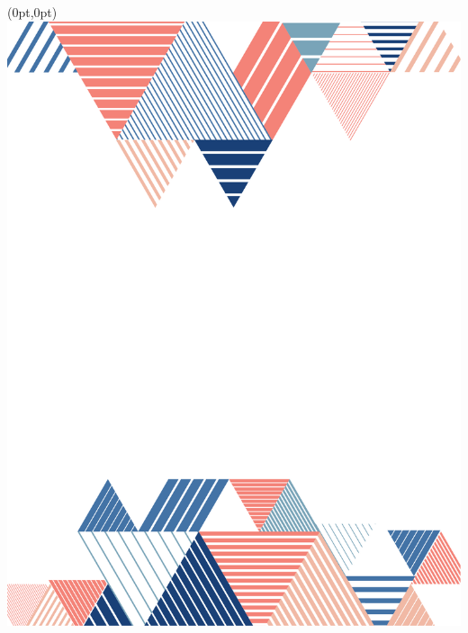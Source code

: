 




\begingroup\thispagestyle{empty}

\begin{textblock*}{2.625in}(0pt,0pt)%
\vspace*{-3.5cm}
\hspace*{-4cm}\includegraphics[scale=1]{../watermarks/front9ano.pdf}
\end{textblock*}
                
